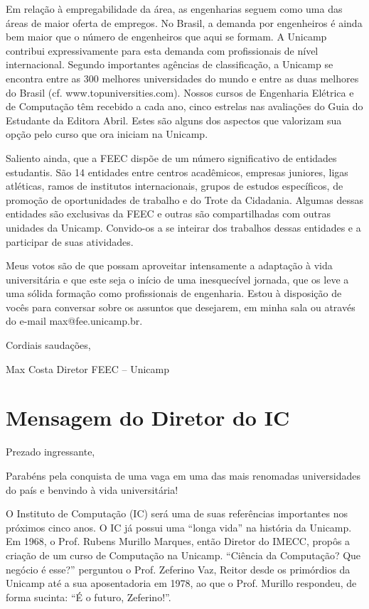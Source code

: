 \documentclass[a4paper,10pt]{article}
\begin{document}
Em relação à empregabilidade da área, as engenharias seguem como uma das áreas
de maior oferta de empregos. No Brasil, a demanda por engenheiros é ainda bem
maior que o número de engenheiros que aqui se formam. A Unicamp contribui
expressivamente para esta demanda com profissionais de nível internacional.
Segundo importantes agências de classificação, a Unicamp se encontra entre as
300 melhores universidades do mundo e entre as duas melhores do Brasil (cf.
www.topuniversities.com). Nossos cursos de Engenharia Elétrica e de Computação
têm recebido a cada ano, cinco estrelas nas avaliações do Guia do Estudante da
Editora Abril. Estes são alguns dos aspectos que valorizam sua opção pelo curso
que ora iniciam na Unicamp.

Saliento ainda, que a FEEC dispõe de um número significativo de entidades
estudantis. São 14 entidades entre centros acadêmicos, empresas juniores, ligas
atléticas, ramos de institutos internacionais, grupos de estudos específicos, de
promoção de oportunidades de trabalho e do Trote da Cidadania. Algumas dessas
entidades são exclusivas da FEEC e outras são compartilhadas com outras unidades
da Unicamp. Convido-os a se inteirar dos trabalhos dessas entidades
e a participar de suas atividades.

Meus votos são de que possam aproveitar intensamente a adaptação à vida
universitária e que este seja o início de uma inesquecível jornada, que os leve
a uma sólida formação como profissionais de engenharia. Estou à disposição de
vocês para conversar sobre os assuntos que desejarem, em minha sala ou através
do e-mail max@fee.unicamp.br.

Cordiais saudações,

Max Costa Diretor
FEEC -- Unicamp

\section{Mensagem do Diretor do IC}
Prezado ingressante,

Parabéns pela conquista de uma vaga em uma das mais renomadas universidades do
país e benvindo à vida universitária!

O Instituto de Computação (IC) será uma de suas referências importantes nos
próximos cinco anos. O IC já possui uma “longa vida” na história da Unicamp. Em
1968, o Prof. Rubens Murillo Marques, então Diretor do IMECC, propôs a criação
de um curso de Computação na Unicamp. “Ciência da Computação? Que negócio
é esse?” perguntou o Prof. Zeferino Vaz, Reitor desde os primórdios da Unicamp
até a sua aposentadoria em 1978, ao que o Prof. Murillo respondeu, de forma
sucinta: “É o futuro, Zeferino!”.
\end{document}
